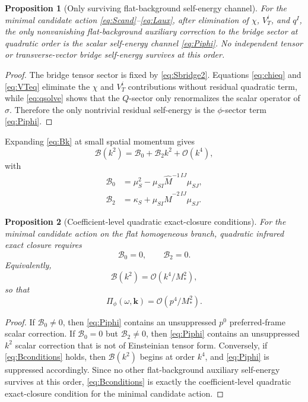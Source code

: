 \documentclass[11pt]{article}
\newtheorem{proposition}{Proposition}
\begin{document}
\begin{proposition}[Only surviving flat-background self-energy channel]
For the minimal candidate action \eqref{eq:Scand}--\eqref{eq:Laux}, after elimination of \(\chi\), \(V_T^i\), and \(q^I\), the only nonvanishing flat-background auxiliary correction to the bridge sector at quadratic order is the scalar self-energy channel \eqref{eq:Piphi}. No independent tensor or transverse-vector bridge self-energy survives at this order.
\end{proposition}

\begin{proof}
The bridge tensor sector is fixed by \eqref{eq:Sbridge2}. Equations \eqref{eq:chieq} and \eqref{eq:VTeq} eliminate the \(\chi\) and \(V_T^i\) contributions without residual quadratic term, while \eqref{eq:qsolve} shows that the \(Q\)-sector only renormalizes the scalar operator of \(\sigma\). Therefore the only nontrivial residual self-energy is the \(\phi\)-sector term \eqref{eq:Piphi}.
\end{proof}

Expanding \eqref{eq:Bk} at small spatial momentum gives
\begin{equation}
\mathcal B(k^2)=\mathcal B_0+\mathcal B_2k^2+\mathcal O(k^4),
\label{eq:Bexpand}
\end{equation}
with
\begin{align}
\mathcal B_0
&=
\mu_S^2-\mu_{SI}\widehat M^{-1\,IJ}\mu_{SJ},
\label{eq:B0}
\\
\mathcal B_2
&=
\kappa_S+\mu_{SI}\widehat M^{-2\,IJ}\mu_{SJ}.
\label{eq:B2}
\end{align}

\begin{proposition}[Coefficient-level quadratic exact-closure conditions]
For the minimal candidate action on the flat homogeneous branch, quadratic infrared exact closure requires
\begin{equation}
\mathcal B_0=0,
\qquad
\mathcal B_2=0.
\label{eq:Bconditions}
\end{equation}
Equivalently,
\begin{equation}
\mathcal B(k^2)=\mathcal O(k^4/M_*^2),
\label{eq:Bsoft}
\end{equation}
so that
\begin{equation}
\Pi_\phi(\omega,\mathbf{k})
=
\mathcal O(p^4/M_*^2).
\label{eq:Piphisoft}
\end{equation}
\end{proposition}

\begin{proof}
If \(\mathcal B_0\neq0\), then \eqref{eq:Piphi} contains an unsuppressed \(p^0\) preferred-frame scalar correction. If \(\mathcal B_0=0\) but \(\mathcal B_2\neq0\), then \eqref{eq:Piphi} contains an unsuppressed \(k^2\) scalar correction that is not of Einsteinian tensor form. Conversely, if \eqref{eq:Bconditions} holds, then \(\mathcal B(k^2)\) begins at order \(k^4\), and \eqref{eq:Piphi} is suppressed accordingly. Since no other flat-background auxiliary self-energy survives at this order, \eqref{eq:Bconditions} is exactly the coefficient-level quadratic exact-closure condition for the minimal candidate action.
\end{proof}
\end{document}
